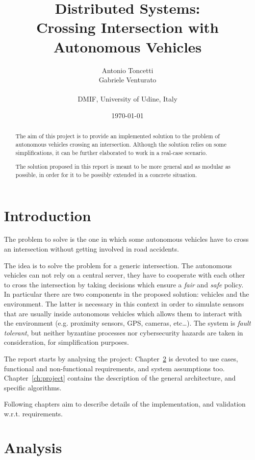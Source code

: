 \documentclass{memoir}
\title{Distributed Systems:\\Crossing Intersection with Autonomous Vehicles}
\author{Antonio Toncetti\\Gabriele Venturato\\\\DMIF, University of Udine, Italy}
\date{%
	\today}
\begin{document}
\maketitle
\begin{abstract}
The aim of this project is to provide an implemented solution to the problem of autonomous vehicles crossing an intersection.
Although the solution relies on some simplifications, it can be further elaborated to work in a real-case scenario.

The solution proposed in this report is meant to be more general and as modular as possible, in order for it to be possibly extended in a concrete situation.
\end{abstract}

\chapter{Introduction}\label{ch:intro}

The problem to solve is the one in which some autonomous vehicles have to cross an intersection without getting involved in road accidents. 

The idea is to solve the problem for a generic intersection. The autonomous vehicles can not rely on a central server, they have to cooperate with each other to cross the intersection by taking decisions which ensure a \emph{fair} and \emph{safe} policy. In particular there are two components in the proposed solution: vehicles and the environment. The latter is necessary in this context in order to simulate sensors that are usually inside autonomous vehicles which allows them to interact with the environment (e.g. proximity sensors, GPS, cameras, etc\dots).
The system is \emph{fault tolerant}, but neither byzantine processes nor cybersecurity hazards are taken in consideration, for simplification purposes.

The report starts by analysing the project: Chapter~\ref{ch:analysis} is devoted to use cases, functional and non-functional requirements, and system assumptions too. Chapter~\ref{ch:project} contains the description of the general architecture, and specific algorithms.

Following chapters aim to describe details of the implementation, and validation w.r.t. requirements.



\chapter{Analysis}\label{ch:analysis}
\end{document}
